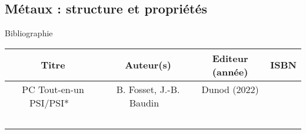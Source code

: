 \begin{headerBlock}
\chapter{Métaux : structure et propriétés}
\label{LC_Metaux}
 \end{headerBlock}



\begin{reportBlock}{Bibliographie}

\begin{center}
\begin{tabular}{|c|c|c|c|}\hline
Titre & Auteur(s) & Editeur (année) & ISBN \\ \hline
PC Tout-en-un PSI/PSI* ~ & B. Fosset, J.-B. Baudin ~ & Dunod (2022) ~ & ~ \\
\hline
 &  &   ~ & ~ \\
\hline
\end{tabular}
\end{center}

\end{reportBlock}

